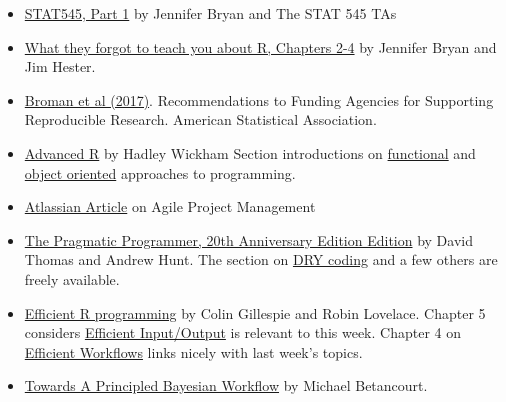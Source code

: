 \documentclass[
  12pt,
]{book}
\providecommand{\tightlist}{%
  \setlength{\itemsep}{0pt}\setlength{\parskip}{0pt}}
\begin{document}
\begin{itemize}
\tightlist
\item
  \href{https://stat545.com/index.html}{STAT545, Part 1} by Jennifer Bryan and The STAT 545 TAs
\end{itemize}

\begin{itemize}
\tightlist
\item
  \href{https://rstats.wtf/}{What they forgot to teach you about R, Chapters 2-4} by Jennifer Bryan and Jim Hester.
\end{itemize}

\begin{itemize}
\tightlist
\item
  \href{https://www.amstat.org/docs/default-source/amstat-documents/pol-reproducibleresearchrecommendations.pdf}{Broman et al (2017)}. Recommendations to Funding Agencies for Supporting Reproducible Research. American Statistical Association.
\end{itemize}

\begin{itemize}
\item
  \href{https://adv-r.hadley.nz/}{Advanced R} by Hadley Wickham Section introductions on \href{https://adv-r.hadley.nz/fp.html}{functional} and \href{https://adv-r.hadley.nz/oo.html}{object oriented} approaches to programming.
\item
  \href{https://www.atlassian.com/agile/project-management}{Atlassian Article} on Agile Project Management
\end{itemize}

\begin{itemize}
\tightlist
\item
  \href{https://pragprog.com/titles/tpp20/the-pragmatic-programmer-20th-anniversary-edition/}{The Pragmatic Programmer, 20th Anniversary Edition Edition} by David Thomas and Andrew Hunt. The section on \href{https://media.pragprog.com/titles/tpp20/dry.pdf}{DRY coding} and a few others are freely available.
\end{itemize}

\begin{itemize}
\item
  \href{https://csgillespie.github.io/efficientR/}{Efficient R programming} by Colin Gillespie and Robin Lovelace. Chapter 5 considers \href{https://csgillespie.github.io/efficientR/input-output.html}{Efficient Input/Output} is relevant to this week. Chapter 4 on \href{https://csgillespie.github.io/efficientR/workflow.html}{Efficient Workflows} links nicely with last week's topics.
\item
  \href{https://betanalpha.github.io/assets/case_studies/principled_bayesian_workflow.html\#References}{Towards A Principled Bayesian Workflow} by Michael Betancourt.
\end{itemize}
\end{document}
